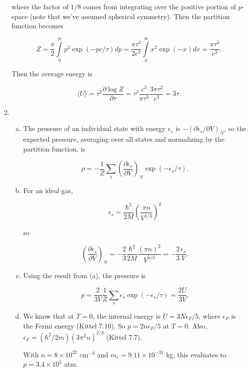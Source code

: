 \documentclass{article}
\begin{document}
\begin{enumerate}
	where the factor of $1/8$ comes from integrating over the positive portion of $p$-space (note that we've assumed spherical symmetry). Then the partition function becomes

	$$Z = \frac{\pi}{2} \int \limits_0^\infty p^2 \exp(-pc / \tau) dp = \frac{\pi \tau^3}{2c^3} \int \limits_0^\infty x^2 \exp(-x) dx = \frac{ \pi \tau^3}{c^3}.$$

	Then the average energy is

	$$\langle U \rangle = \tau^2 \frac{\partial \log Z}{\partial \tau} = \tau^2 \frac{c^3}{\pi \tau^3} \frac{ 3 \pi \tau^2}{c^3} = 3 \tau.$$

	\item

	\begin{enumerate}[(a)]

		\item

		The pressure of an individual state with energy $\epsilon_s$ is $-(\partial \epsilon_s / \partial V)_N$, so the expected pressure, averaging over all states and normalizing by the partition function, is

		$$p = -\frac{1}{Z} \sum_s \left( \frac{\partial \epsilon_s}{ \partial V} \right)_N \exp(-\epsilon_s / \tau).$$

		\item

		For an ideal gas, 

		$$\epsilon_s = \frac{\hbar^2}{2M} \left( \frac{\pi n}{V^{1/3}} \right)^2$$

		so

		$$\left( \frac{\partial \epsilon_s}{ \partial V} \right)_N = -\frac{2}{3} \frac{\hbar^2}{2M} \frac{(\pi n)^2}{V^{5/3}} = -\frac{2}{3}\frac{\epsilon_s}{V}.$$

		\item

		Using the result from (a), the pressure is

		$$p = \frac{2}{3V} \frac{1}{Z} \sum_s  \epsilon_s \exp(-\epsilon_s / \tau) = \frac{2U}{3V}.$$

		\item

		We know that at $T =0$, the internal energy is $U = 3N \epsilon_F / 5$, where $\epsilon_F$ is the Fermi energy (Kittel 7.10). So $p = 2n \epsilon_F / 5$ at $T =0$. Also, $\epsilon_F = (\hbar^2 / 2m) (3 \pi^2 n)^{2/3}$ (Kittel 7.7).

		With $n = 8 \times 10^{22} \text{ cm}^{-3}$ and $m_e = 9.11 \times 10^{-31}$ kg, this evaluates to $p = 3.4 \times 10^5$ atm.


\end{enumerate}
\end{enumerate}
\end{document}
